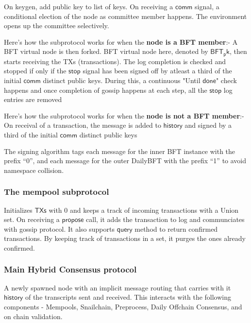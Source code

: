 On keygen, add public key to list of keys. On receiving a $\mathsf{comm}$ signal, a conditional election of the node as committee member happens.
The environment opens up the committee selectively.

Here's how the subprotocol works for when the \textbf{node is a BFT member}:-
A BFT virtual node is then forked. BFT virtual node here, denoted by $\mathsf{BFT_pk}$, then starts receiving the TXs (transactions).
The log completion is checked and stopped if only if the $\mathsf{stop}$ signal has been signed off by atleast a third of the initial
$\mathsf{comm}$ distinct public keys. During this, a continuous "Until $\mathsf{done}$" check happens and once completion of gossip
happens at each step, all the $\mathsf{stop}$ log entries are removed

Here's how the subprotocol works for when the \textbf{node is not a BFT member}:-
On receival of a transaction, the message is added to $\mathsf{history}$ and signed by a third of the initial
$\mathsf{comm}$ distinct public keys

The signing algorithm tags each message for the inner BFT instance
with the prefix “0”, and each message for the outer DailyBFT with the prefix “1” to avoid namespace collision.

\subsubsection{The mempool subprotocol}

Initializes $\mathsf{TXs}$ with 0 and keeps a track of incoming transactions with a Union set. On receiving a $\mathsf{propose}$ call, it adds the
transaction to log and communciates with gossip protocol. It also supports $\mathsf{query}$ method to return confirmed transactions. By keeping
track of transactions in a set, it purges the ones already confirmed.

\subsubsection{Main Hybrid Consensus protocol}

A newly spawned node with an implicit message routing that carries with it $\mathsf{history}$ of the transcripts sent and received.
This interacts with the following components - Mempools, Snailchain, Preprocess, Daily Offchain Consensus, and on chain validation.

